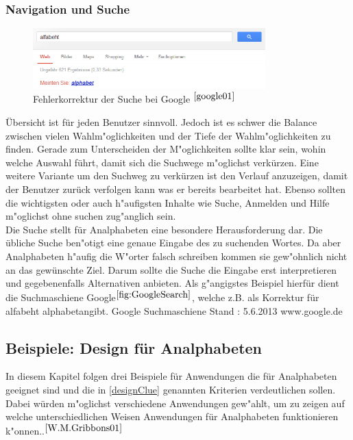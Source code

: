 \subsubsection{Navigation und Suche}
\begin{figure}[h]
	\centering
		\includegraphics[width=0.80\textwidth]{Daten/rechtschreibung.png}
	\caption{Fehlerkorrektur der Suche bei Google $^{\ref{google01}}$}
	\label{fig:GoogleSearch}
\end{figure}

Übersicht ist für jeden Benutzer sinnvoll. Jedoch ist es schwer die Balance zwischen vielen Wahlm"oglichkeiten und der Tiefe der Wahlm"oglichkeiten zu finden. Gerade zum Unterscheiden der M"oglichkeiten sollte klar sein, wohin welche Auswahl führt, damit sich
 die Suchwege m"oglichst verkürzen. Eine weitere Variante um den Suchweg zu verkürzen ist den Verlauf anzuzeigen, damit der Benutzer zurück verfolgen kann was er bereits bearbeitet hat. Ebenso sollten die wichtigsten oder auch h"aufigsten Inhalte wie Suche, Anmelden und Hilfe m"oglichst ohne suchen zug"anglich sein.\\
Die Suche stellt für Analphabeten eine besondere Herausforderung dar. Die übliche Suche ben"otigt eine genaue Eingabe des zu suchenden Wortes. Da aber Analphabeten h"aufig die W"orter falsch schreiben kommen sie gew"ohnlich nicht an das gewünschte Ziel. Darum sollte die Suche die Eingabe erst interpretieren und gegebenenfalls Alternativen anbieten.
Als g"angigstes Beispiel hierfür dient die Suchmaschiene Google$^{\ref{fig:GoogleSearch}}$, welche z.B. als Korrektur für \glqq alfabeht \grqq \glqq alphabet\grqq angibt.
						{Google Suchmaschiene}
						{Stand : 5.6.2013}
						{www.google.de}

\subsection{Beispiele: Design für Analphabeten}
In diesem Kapitel folgen drei Beispiele für Anwendungen die für Analphabeten geeignet sind und die in \ref{designClue} genannten Kriterien verdeutlichen sollen. Dabei würden m"oglichst verschiedene Anwendungen gew"ahlt, um zu zeigen auf welche unterschiedlichen Weisen Anwendungen für Analphabeten funktionieren k"onnen..$^{\ref{W.M.Gribbons01}}$\\


